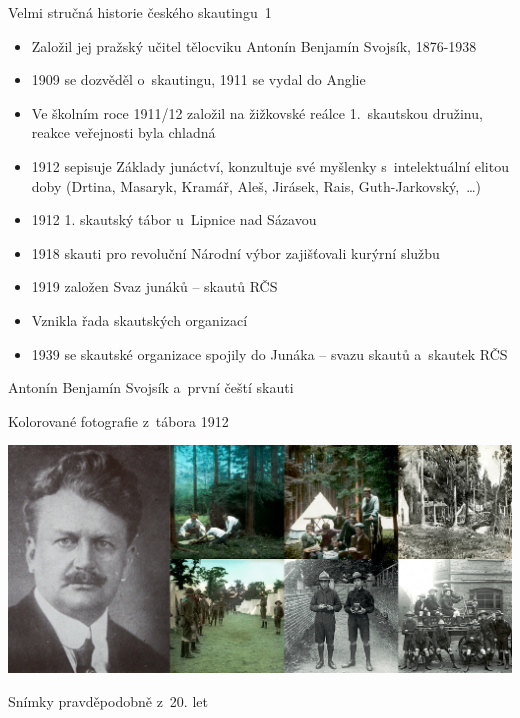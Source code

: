 \documentclass[compress,xelatex,xcolor=dvipsnames,print]{beamer}
\begin{document}
\begin{frame}{Velmi stručná historie českého skautingu~1}
\begin{itemize}
 \item Založil jej pražský učitel tělocviku Antonín Benjamín Svojsík, 1876-1938
 \item 1909 se dozvěděl o~skautingu, 1911 se vydal do Anglie
 \item Ve školním roce 1911/12 založil na žižkovské reálce 1.~skautskou družinu, reakce veřejnosti byla chladná
 \item 1912 sepisuje Základy junáctví, konzultuje své myšlenky s~intelektuální elitou doby (Drtina, Masaryk, Kramář, Aleš, Jirásek, Rais, Guth-Jarkovský,~\ldots)
 \item 1912 1. skautský tábor u~Lipnice nad Sázavou
 \item 1918 skauti pro revoluční Národní výbor zajišťovali kurýrní službu
 \item 1919 založen Svaz junáků -- skautů RČS
 \item Vznikla řada skautských organizací
 \item 1939 se skautské organizace spojily do Junáka -- svazu skautů a~skautek RČS
\end{itemize}
\end{frame}

\begin{frame}{Antonín Benjamín Svojsík a~první čeští skauti}
\begin{flushright}
Kolorované fotografie z~tábora 1912\\
\end{flushright}
\includegraphics[width=\textwidth]{svojsik_prvni_skauti.jpg}
\begin{flushright}
Snímky pravděpodobně z~20. let\\
\end{flushright}
\end{frame}
\end{document}
